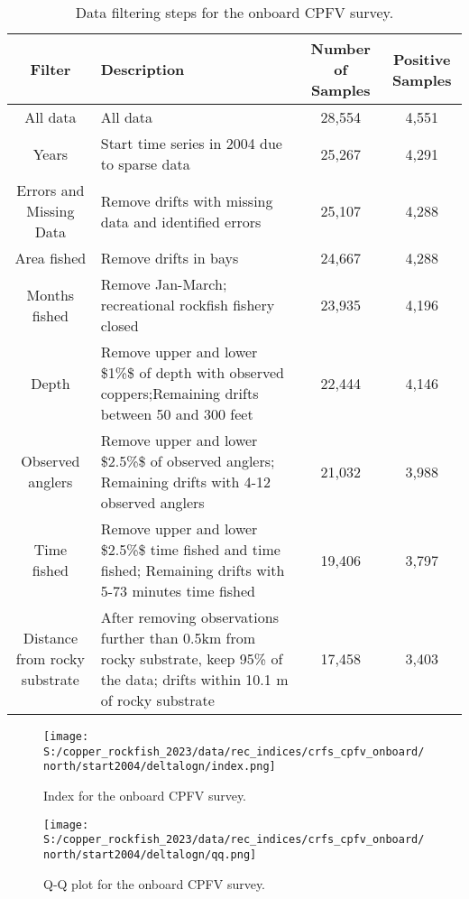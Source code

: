 \documentclass[11pt,
  letterpaper,
]{article}
\begin{document}
\begin{landscape}\begin{table}[H]
\centering
\caption{\label{tab:onboard-filter}Data filtering steps for the onboard CPFV survey.}
\centering
\fontsize{10}{12}\selectfont
\fontsize{10}{12}\selectfont
\begin{tabular}[t]{c>{\centering\arraybackslash}p{8cm}cc}
\toprule
Filter & Description & Number of Samples & Positive Samples\\
\midrule
All data & All data & 28,554 & 4,551\\
Years & Start time series in 2004 due to sparse data & 25,267 & 4,291\\
Errors and Missing Data & Remove drifts with missing data and identified errors & 25,107 & 4,288\\
Area fished & Remove drifts in bays & 24,667 & 4,288\\
Months fished & Remove Jan-March; recreational rockfish fishery closed & 23,935 & 4,196\\
Depth & Remove upper and lower \$1\%\$ of depth with observed coppers;Remaining drifts between 50 and 300 feet & 22,444 & 4,146\\
Observed anglers & Remove upper and lower \$2.5\%\$ of observed anglers;  Remaining drifts with 4-12 observed anglers & 21,032 & 3,988\\
Time fished & Remove upper and lower \$2.5\%\$ time fished and
                                         time fished; Remaining drifts with 5-73 minutes time fished & 19,406 & 3,797\\
Distance from rocky substrate & After removing observations further
than 0.5km from rocky substrate, keep 95\% of the data; drifts within 10.1 m of rocky substrate & 17,458 & 3,403\\
\bottomrule
\end{tabular}
\end{table}
\end{landscape}

\begin{figure}
{\centering
\texttt{[image: S:/copper\_rockfish\_2023/data/rec\_indices/crfs\_cpfv\_onboard/north/start2004/deltalogn/index.png]}
}
\caption{Index for the onboard CPFV survey.\label{fig:onboard-index}}
\end{figure}

\begin{figure}
{\centering
\texttt{[image: S:/copper\_rockfish\_2023/data/rec\_indices/crfs\_cpfv\_onboard/north/start2004/deltalogn/qq.png]}
}
\caption{Q-Q plot for the onboard CPFV survey.\label{fig:onboard-qq}}
\end{figure}
\end{document}
